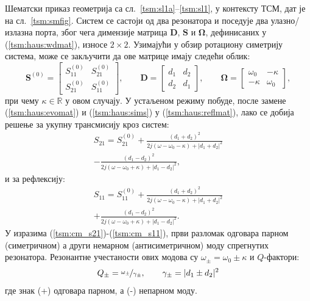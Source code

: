 Шематски приказ геометрија са сл.~\ref{tsm:sl1a}--\ref{tsm:sl1}, у контексту ТСМ, дат је на сл.~\ref{tsm:smfig}. Систем се састоји од два резонатора и поседује два улазно/излазна порта, због чега димензије матрица $\mathbf{D}$, $\mathbf{S}$ и $\mathbf{\Omega}$, дефинисаних у (\ref{tsm:haus:wdmat}), износе $2\times 2$. Узимајући у обзир ротациону симетрију система, може се закључити да ове матрице имају следећи облик:
\begin{equation}
\mathbf{S}^{(0)} = \begin{bmatrix}
S^{(0)}_{11} & S^{(0)}_{21} \\
S^{(0)}_{21} & S^{(0)}_{11}
\end{bmatrix},\qquad
\mathbf{D} = \begin{bmatrix}
d_1 & d_2 \\
d_2 & d_1
\end{bmatrix},\qquad
\mathbf{\Omega} = \begin{bmatrix}
\omega_0 & -\kappa \\
-\kappa & \omega_0
\end{bmatrix},
\label{tsm:haus:sims}\end{equation}
при чему $\kappa\in \mathbb{R}$ у овом случају. У устаљеном режиму побуде, после замене (\ref{tsm:haus:evomat}) и (\ref{tsm:haus:sims}) у (\ref{tsm:haus:reflmat}), лако се добија решење за укупну трансмисију кроз систем:
\begin{equation}
\begin{split}
S_{21} = S^{(0)}_{21} + \frac{(d_1+d_2)^2}{2j(\omega-\omega_0 - \kappa) + |d_1+d_2|^2}\\
- \frac{(d_1-d_2)^2}{2j(\omega-\omega_0 + \kappa) + |d_1-d_2|^2},
\end{split}\label{tsm:cm_s21}
\end{equation}
и за рефлексију:
\begin{equation}
\begin{split}
S_{11} = S^{(0)}_{11} + \frac{(d_1+d_2)^2}{2j(\omega-\omega_0 - \kappa) + |d_1+d_2|^2}\\
+ \frac{(d_1-d_2)^2}{2j(\omega-\omega_0 + \kappa) + |d_1-d_2|^2}.
\end{split}\label{tsm:cm_s11}
\end{equation}
У изразима (\ref{tsm:cm_s21})-(\ref{tsm:cm_s11}), први разломак одговара парном (симетричном) а други немарном (антисиметричном) моду спрегнутих резонатора. Резонантне учестаности ових модова су $\omega_{\pm} = \omega_0 \pm \kappa$ и $Q$-фактори:
\begin{equation}
Q_\pm = \nicefrac{\omega_\pm}{\gamma_{\pm}},\qquad \gamma_{\pm} = |d_1 \pm d_2|^2
\end{equation}
где знак (+) одговара парном, а (-) непарном моду.
% 
% 

